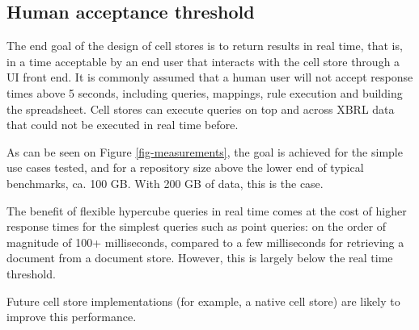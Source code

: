 \documentclass{acm_proc_article-sp}
\begin{document}
\subsection{Human acceptance threshold}

The end goal of the design of cell stores is to return results in real time, that is, in a time acceptable by an end user that interacts with the cell store through a UI front end. It is commonly assumed that a human user will not accept response times above 5 seconds, including queries, mappings, rule execution and building the spreadsheet. Cell stores can execute queries on top and across XBRL data that could not be executed in real time before.

As can be seen on Figure \ref{fig-measurements}, the goal is achieved for the simple use cases tested, and for a repository size above the lower end of typical benchmarks, ca. 100 GB. With 200 GB of data, this is the case.

The benefit of flexible hypercube queries in real time comes at the cost of higher response times for the simplest queries such as point queries: on the order of magnitude of 100+ milliseconds, compared to a few milliseconds for retrieving a document from a document store. However, this is largely below the real time threshold.

Future cell store implementations (for example, a native cell store) are likely to improve this performance.
\end{document}
